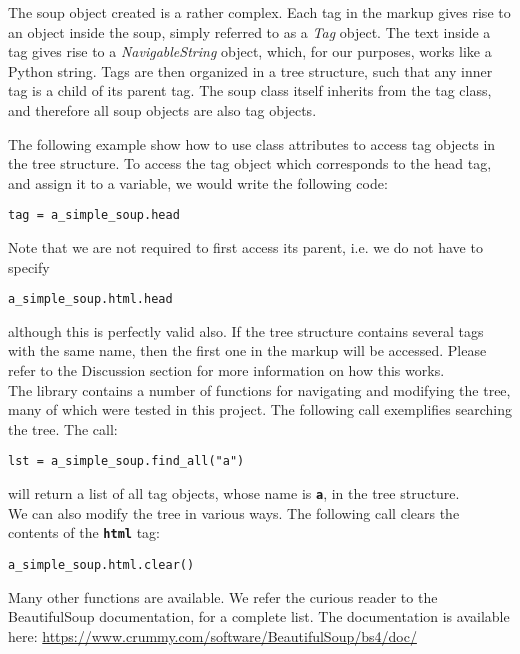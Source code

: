 \documentclass[10pt]{article}
\begin{document}
The soup object created is a rather complex. Each tag in the markup gives rise to an object inside the soup, simply referred to as a \textit{Tag} object. The text inside a tag gives rise to a \textit{NavigableString} object, which, for our purposes, works like a Python string. Tags are then organized in a tree structure, such that any inner tag is a child of its parent tag. The soup class itself inherits from the tag class, and therefore all soup objects are also tag objects. 

The following example show how to use class attributes to access tag objects in the tree structure. To access the tag object which corresponds to the head tag, and assign it to a variable, we would write the following code:

\begin{lstlisting}[style = pythonstyle]
tag = a_simple_soup.head
\end{lstlisting}

Note that we are not required to first access its parent, i.e. we do not have to specify
\begin{lstlisting}[style = pythonstyle]
a_simple_soup.html.head
\end{lstlisting}
although this is perfectly valid also. If the tree structure contains several tags with the same name, then the first one in the markup will be accessed. Please refer to the Discussion section for more information on how this works. \\

The library contains a number of functions for navigating and modifying the tree, many of which were tested in this project. The following call exemplifies searching the tree. The call: 

\begin{lstlisting}[style = pythonstyle]
lst = a_simple_soup.find_all("a")
\end{lstlisting}
will return a list of all tag objects, whose name is \texttt{\textbf{a}}, in the tree structure. \\

We can also modify the tree in various ways. The following call clears the contents of the \texttt{\textbf{html}} tag:

\begin{lstlisting}[style = pythonstyle]
a_simple_soup.html.clear()
\end{lstlisting}

Many other functions are available. We refer the curious reader to the BeautifulSoup documentation, for a complete list. The documentation is available here: \url{https://www.crummy.com/software/BeautifulSoup/bs4/doc/}
\end{document}
